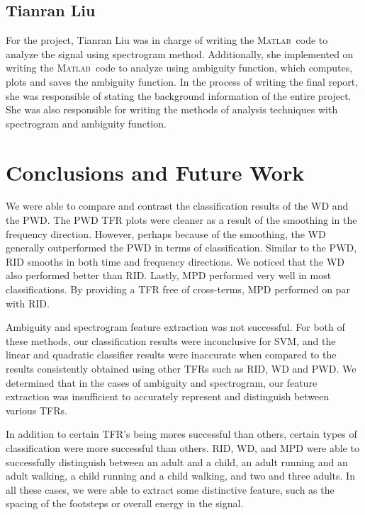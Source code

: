 \documentclass{article}[11pt]
\newcommand{\Matlab}{\textsc{Matlab}}
\begin{document}
\subsection{Tianran Liu}
\label{sec:Tianran}
For the project, Tianran Liu was in charge of writing the \Matlab\ code to analyze the signal using spectrogram method. Additionally, she implemented on writing the \Matlab\ code to analyze using ambiguity function, which computes, plots and saves the ambiguity function. In the process of  writing the final report, she was responsible of stating the background information of the entire project. She was also responsible for writing the methods of analysis techniques with spectrogram and ambiguity function.

\section{Conclusions and Future Work}
\label{sec:conclusion}
We were able to compare and contrast the classification results of the WD and the PWD. The PWD TFR plots were cleaner as a result of the smoothing in the frequency direction.  However, perhaps because of the smoothing, the WD generally outperformed the PWD in terms of classification. Similar to the PWD, RID smooths in both time and frequency directions. We noticed that the WD also performed better than RID.  Lastly, MPD performed very well in most classifications.  By providing a TFR free of cross-terms, MPD performed on par  with RID.

Ambiguity and spectrogram feature extraction was not successful.  For both of these methods, our classification results were inconclusive for SVM, and the linear and quadratic classifier results were inaccurate when compared to the results consistently obtained using other TFRs such as RID, WD and PWD. We determined that in the cases of ambiguity and spectrogram, our feature extraction was insufficient to accurately represent and distinguish between various TFRs. 

In addition to certain TFR's being mores successful than others, certain types of classification were more successful than others.  RID, WD, and MPD were able to successfully distinguish between an adult and a child, an adult running and an adult walking, a child running and a child walking, and two and three adults.  In all these cases, we were able to extract some distinctive feature, such as the spacing of the footsteps or overall energy in the signal.
\end{document}
